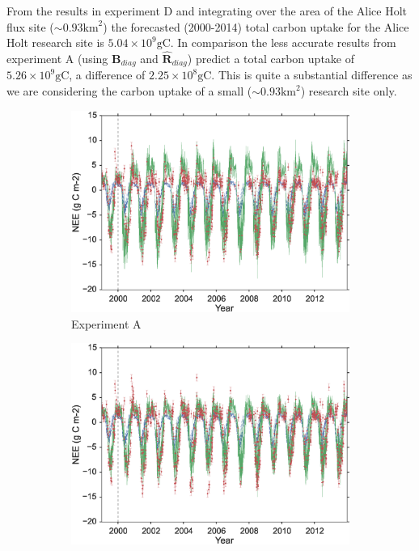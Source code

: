 \documentclass[11pt]{article}
\begin{document}
From the results in experiment D and integrating over the area of the Alice Holt flux site ($\sim 0.93\text{km}^2$) the forecasted (2000-2014) total carbon uptake for the Alice Holt research site is $5.04\times 10^9 \text{gC}$. In comparison the less accurate results from experiment A (using $\textbf{B}_{diag}$ and $\hat{\textbf{R}}_{diag}$) predict a total carbon uptake of $5.26 \times 10^9\text{gC}$, a difference of $2.25 \times 10^8\text{gC}$. This is quite a substantial difference as we are considering the carbon uptake of a small ($\sim 0.93\text{km}^2$) research site only.

\begin{figure}
    \centering
    \begin{subfigure}[b]{0.49\textwidth}
        \includegraphics[width=\textwidth]{A4dvar.eps}
        \caption{Experiment A}
        \label{fig:4dvardiagBR}
    \end{subfigure}
    \begin{subfigure}[b]{0.49\textwidth}
        \includegraphics[width=\textwidth]{B4dvar.eps}

\end{subfigure}
\end{figure}
\end{document}
